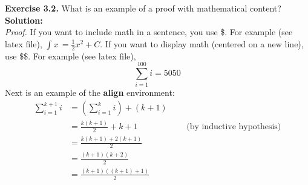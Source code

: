 \documentclass{article}
\begin{document}
	\noindent\textbf{Exercise 3.2.} What is an example of a proof with mathematical content?\\
	
	\noindent\textbf{Solution:}\\
	
	\noindent\textit{Proof.} If you want to include math in a sentence, you use \$. For example (see latex file), $ \int x\, = \frac{1}{2}x^2 + C $. If you want to display math (centered on a new line), use \$\$. For example (see latex file),
	\[
	\sum_{i=1}^{100} i = 5050
	\]
	Next is an example of the \textbf{align} environment:
	\begin{align*}
		\sum_{i=1}^{k+1} i &= \left(\sum_{i=1}^{k} i \right) + (k + 1)\\
		                   &= \frac{k(k + 1)}{2} + k +1 \quad \hspace{2cm} \text{(by inductive hypothesis)} \\
		                   &= \frac{k(k + 1) + 2(k + 1)}{2}\\
		                   &= \frac{(k + 1)(k + 2)}{2}\\
		                   &= \frac{(k + 1)((k + 1) + 1)}{2}
	\end{align*}
\end{document}
